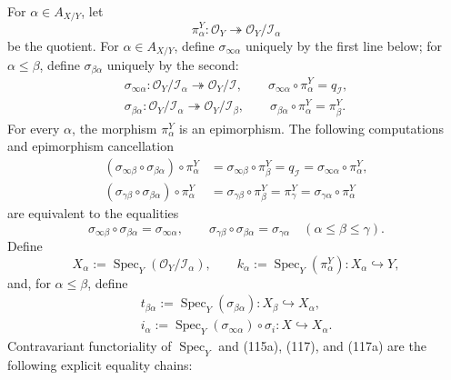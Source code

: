 \begin{definition}
  For $\alpha\in A_{X/Y}$, let
  \[
    \pi_\alpha^Y\colon\mathcal O_Y\twoheadrightarrow
      \mathcal O_Y/\mathcal I_\alpha
  \]
  be the quotient.  For $\alpha\in A_{X/Y}$, define
  $\sigma_{\infty\alpha}$ uniquely by the first line below; for
  $\alpha\leq\beta$, define $\sigma_{\beta\alpha}$ uniquely by the second:
  \[
  \begin{gathered}
    \sigma_{\infty\alpha}\colon
      \mathcal O_Y/\mathcal I_\alpha
        \twoheadrightarrow\mathcal O_Y/\mathcal I,
    \qquad
    \sigma_{\infty\alpha}\circ\pi_\alpha^Y=q_{\mathcal I},\\
    \sigma_{\beta\alpha}\colon
      \mathcal O_Y/\mathcal I_\alpha
        \twoheadrightarrow\mathcal O_Y/\mathcal I_\beta,
    \qquad
    \sigma_{\beta\alpha}\circ\pi_\alpha^Y=\pi_\beta^Y.
  \end{gathered} \tag{117}
  \]
  For every $\alpha$, the morphism $\pi_\alpha^Y$ is an epimorphism.  The
  following computations and epimorphism cancellation
  \[
  \begin{aligned}
    (\sigma_{\infty\beta}\circ\sigma_{\beta\alpha})
      \circ\pi_\alpha^Y
      &=\sigma_{\infty\beta}\circ\pi_\beta^Y
       =q_{\mathcal I}
       =\sigma_{\infty\alpha}\circ\pi_\alpha^Y,\\
    (\sigma_{\gamma\beta}\circ\sigma_{\beta\alpha})
      \circ\pi_\alpha^Y
      &=\sigma_{\gamma\beta}\circ\pi_\beta^Y
       =\pi_\gamma^Y
       =\sigma_{\gamma\alpha}\circ\pi_\alpha^Y
  \end{aligned}
  \]
  are equivalent to the equalities
  \[
    \sigma_{\infty\beta}\circ\sigma_{\beta\alpha}
      =\sigma_{\infty\alpha},
    \qquad
    \sigma_{\gamma\beta}\circ\sigma_{\beta\alpha}
      =\sigma_{\gamma\alpha}
      \quad(\alpha\leq\beta\leq\gamma).                       \tag{117a}
  \]
  Define
  \[
    X_\alpha:=\operatorname{Spec}_Y
      (\mathcal O_Y/\mathcal I_\alpha),
    \qquad
    k_\alpha:=\operatorname{Spec}_Y(\pi_\alpha^Y)\colon
      X_\alpha\hookrightarrow Y,                                \tag{118}
  \]
  and, for $\alpha\leq\beta$, define
  \[
  \begin{gathered}
    t_{\beta\alpha}:=\operatorname{Spec}_Y(\sigma_{\beta\alpha})
      \colon X_\beta\hookrightarrow X_\alpha,\\
    i_\alpha:=\operatorname{Spec}_Y(\sigma_{\infty\alpha})
      \circ\sigma_i\colon X\hookrightarrow X_\alpha.          
  \end{gathered} \tag{119}
  \]
  Contravariant functoriality of $\operatorname{Spec}_Y$ and
  (115a), (117), and (117a) are the following explicit equality chains:

\end{definition}

